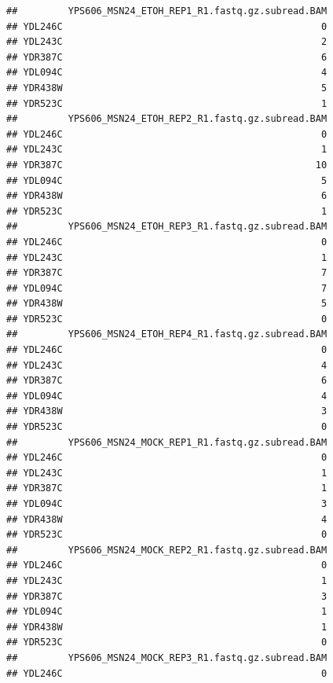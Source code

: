 \documentclass[
]{book}
\begin{document}
\begin{verbatim}
##         YPS606_MSN24_ETOH_REP1_R1.fastq.gz.subread.BAM
## YDL246C                                              0
## YDL243C                                              2
## YDR387C                                              6
## YDL094C                                              4
## YDR438W                                              5
## YDR523C                                              1
##         YPS606_MSN24_ETOH_REP2_R1.fastq.gz.subread.BAM
## YDL246C                                              0
## YDL243C                                              1
## YDR387C                                             10
## YDL094C                                              5
## YDR438W                                              6
## YDR523C                                              1
##         YPS606_MSN24_ETOH_REP3_R1.fastq.gz.subread.BAM
## YDL246C                                              0
## YDL243C                                              1
## YDR387C                                              7
## YDL094C                                              7
## YDR438W                                              5
## YDR523C                                              0
##         YPS606_MSN24_ETOH_REP4_R1.fastq.gz.subread.BAM
## YDL246C                                              0
## YDL243C                                              4
## YDR387C                                              6
## YDL094C                                              4
## YDR438W                                              3
## YDR523C                                              0
##         YPS606_MSN24_MOCK_REP1_R1.fastq.gz.subread.BAM
## YDL246C                                              0
## YDL243C                                              1
## YDR387C                                              1
## YDL094C                                              3
## YDR438W                                              4
## YDR523C                                              0
##         YPS606_MSN24_MOCK_REP2_R1.fastq.gz.subread.BAM
## YDL246C                                              0
## YDL243C                                              1
## YDR387C                                              3
## YDL094C                                              1
## YDR438W                                              1
## YDR523C                                              0
##         YPS606_MSN24_MOCK_REP3_R1.fastq.gz.subread.BAM
## YDL246C                                              0

\end{verbatim}
\end{document}
